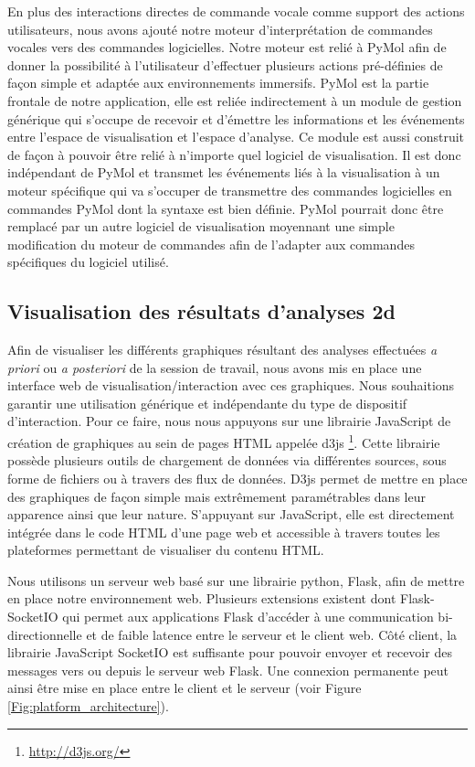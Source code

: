 En plus des interactions directes de commande vocale comme support des actions utilisateurs, nous avons ajouté notre moteur d'interprétation de commandes vocales vers des commandes logicielles. Notre moteur est relié à PyMol afin de donner la possibilité à l'utilisateur d'effectuer plusieurs actions pré-définies de façon simple et adaptée aux environnements immersifs.
PyMol est la partie frontale de notre application, elle est reliée indirectement à un module de gestion générique qui s'occupe de recevoir et d'émettre les informations et les événements entre l'espace de visualisation et l'espace d'analyse. Ce module est aussi construit de façon à pouvoir être relié à n'importe quel logiciel de visualisation. Il est donc indépendant de PyMol et transmet les événements liés à la visualisation à un moteur spécifique qui va s'occuper de transmettre des commandes logicielles en commandes PyMol dont la syntaxe est bien définie. PyMol pourrait donc être remplacé par un autre logiciel de visualisation moyennant une simple modification du moteur de commandes afin de l'adapter aux commandes spécifiques du logiciel utilisé.

\subsection{Visualisation des résultats d'analyses 2d}

Afin de visualiser les différents graphiques résultant des analyses effectuées \textit{a priori} ou \textit{a posteriori} de la session de travail, nous avons mis en place une interface web de visualisation/interaction avec ces graphiques. Nous souhaitions garantir une utilisation générique et indépendante du type de dispositif d'interaction. Pour ce faire, nous nous appuyons sur une librairie JavaScript de création de graphiques au sein de pages HTML appelée d3js \footnote{\url{http://d3js.org/}}. Cette librairie possède plusieurs outils de chargement de données via différentes sources, sous forme de fichiers ou à travers des flux de données. D3js permet de mettre en place des graphiques de façon simple mais extrêmement paramétrables dans leur apparence ainsi que leur nature. S'appuyant sur JavaScript, elle est directement intégrée dans le code HTML d'une page web et accessible à travers toutes les plateformes permettant de visualiser du contenu HTML.

Nous utilisons un serveur web basé sur une librairie python, Flask, afin de mettre en place notre environnement web. Plusieurs extensions existent dont Flask-SocketIO qui permet aux applications Flask d'accéder à une communication bi-directionnelle et de faible latence entre le serveur et le client web. Côté client, la librairie JavaScript SocketIO est suffisante pour pouvoir envoyer et recevoir des messages vers ou depuis le serveur web Flask. Une connexion permanente peut ainsi être mise en place entre le client et le serveur (voir Figure \ref{Fig:platform_architecture}).

